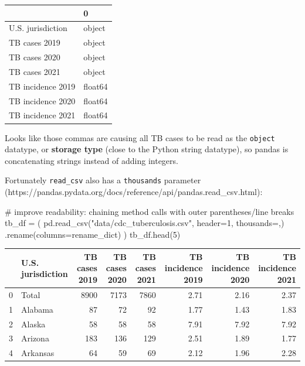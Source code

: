 \documentclass[
  letterpaper,
  DIV=11,
  numbers=noendperiod]{scrreprt}
\newenvironment{Shaded}{\begin{snugshade}}{\end{snugshade}}
\newcommand{\CommentTok}[1]{\textcolor[rgb]{0.37,0.37,0.37}{#1}}
\newcommand{\DecValTok}[1]{\textcolor[rgb]{0.68,0.00,0.00}{#1}}
\newcommand{\NormalTok}[1]{\textcolor[rgb]{0.00,0.23,0.31}{#1}}
\newcommand{\OperatorTok}[1]{\textcolor[rgb]{0.37,0.37,0.37}{#1}}
\newcommand{\StringTok}[1]{\textcolor[rgb]{0.13,0.47,0.30}{#1}}
\begin{document}
\begin{tabular}{ll}
\toprule
{} &        0 \\
\midrule
U.S. jurisdiction &   object \\
TB cases 2019     &   object \\
TB cases 2020     &   object \\
TB cases 2021     &   object \\
TB incidence 2019 &  float64 \\
TB incidence 2020 &  float64 \\
TB incidence 2021 &  float64 \\
\bottomrule
\end{tabular}

Looks like those commas are causing all TB cases to be read as the
\texttt{object} datatype, or \textbf{storage type} (close to the Python
string datatype), so pandas is concatenating strings instead of adding
integers.

Fortunately \texttt{read\_csv} also has a \texttt{thousands} parameter
(https://pandas.pydata.org/docs/reference/api/pandas.read\_csv.html):

\begin{Shaded}
\begin{Highlighting}[]
\CommentTok{\# improve readability: chaining method calls with outer parentheses/line breaks}
\NormalTok{tb\_df }\OperatorTok{=}\NormalTok{ (}
\NormalTok{    pd.read\_csv(}\StringTok{"data/cdc\_tuberculosis.csv"}\NormalTok{, header}\OperatorTok{=}\DecValTok{1}\NormalTok{, thousands}\OperatorTok{=}\StringTok{\textquotesingle{},\textquotesingle{}}\NormalTok{)}
\NormalTok{    .rename(columns}\OperatorTok{=}\NormalTok{rename\_dict)}
\NormalTok{)}
\NormalTok{tb\_df.head(}\DecValTok{5}\NormalTok{)}
\end{Highlighting}
\end{Shaded}

\begin{tabular}{llrrrrrr}
\toprule
{} & U.S. jurisdiction &  TB cases 2019 &  TB cases 2020 &  TB cases 2021 &  TB incidence 2019 &  TB incidence 2020 &  TB incidence 2021 \\
\midrule
0 &             Total &           8900 &           7173 &           7860 &               2.71 &               2.16 &               2.37 \\
1 &           Alabama &             87 &             72 &             92 &               1.77 &               1.43 &               1.83 \\
2 &            Alaska &             58 &             58 &             58 &               7.91 &               7.92 &               7.92 \\
3 &           Arizona &            183 &            136 &            129 &               2.51 &               1.89 &               1.77 \\
4 &          Arkansas &             64 &             59 &             69 &               2.12 &               1.96 &               2.28 \\
\bottomrule
\end{tabular}
\end{document}
